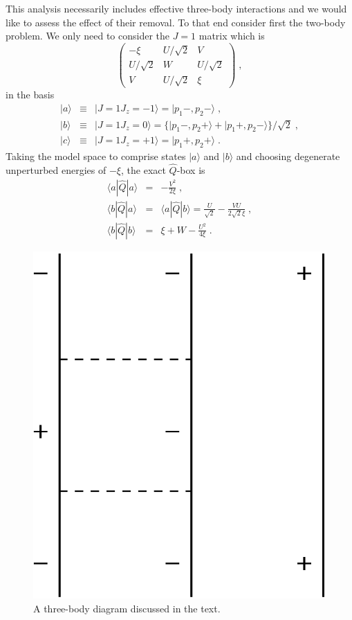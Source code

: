 \documentclass[prc,aps,amsmath,amssymb,preprintnumbers,showpacs,twocolumn]{revtex4}
\newcommand{\bq}{\begin{eqnarray}}
\newcommand{\eq}{\end{eqnarray}}
\begin{document}
This analysis necessarily includes effective three-body interactions and we 
would like to assess the effect of their removal. To that end consider first 
the two-body problem. We only need to consider the $J=1$ matrix which is
\begin{equation}
\left(\begin{array}{ccc}
-\xi&U/\sqrt{2}&V\\
U/\sqrt{2}&W&U/\sqrt{2}\\
V&U/\sqrt{2}&\xi
\end{array}\right)\;, \label{mat33}
\end{equation}
in the basis
\bq
|a\rangle&\equiv&|J=1 J_z=-1\rangle=|p_1-,p_2-\rangle\;,\nonumber\\
|b\rangle&\equiv&|J=1 J_z=0\rangle=\bigl\{|p_1-,p_2+\rangle
+|p_1+,p_2-\rangle\bigr\}/\sqrt{2}\;,\nonumber\\
|c\rangle&\equiv&|J=1 J_z=+1\rangle
=|p_1+,p_2+\rangle\;.\label{2basis}
\eq
Taking the model space to comprise states $|a\rangle$ and $|b\rangle$
and choosing degenerate unperturbed energies of $-\xi$, the exact
$\hat{Q}$-box is
\begin{eqnarray}
\langle a|\hat{Q}|a\rangle&=&-\frac{V^2}{2\xi}\;,\nonumber\\
\langle b|\hat{Q}|a\rangle&=&\langle a|\hat{Q}|b\rangle=\frac{U}{\sqrt{2}}
-\frac{VU}{2\sqrt{2}\xi}\;,\nonumber\\
\langle b|\hat{Q}|b\rangle&=&\xi+W-\frac{U^2}{4\xi}\;.
\end{eqnarray}
%
\begin{figure}[t]
 \includegraphics[width=3truecm]{fig6.eps}
\caption{A three-body diagram discussed in the text.} \label{f6}
\end{figure}
\end{document}
